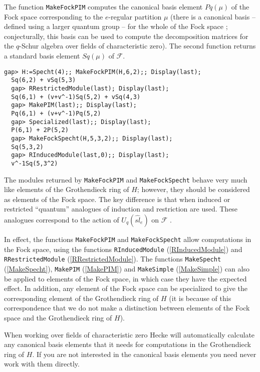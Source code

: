 \documentclass[a4paper,11pt]{report}
\begin{document}
{{{ The function \texttt{MakeFockPIM} computes the canonical basis element $Pq(\mu)$ of the Fock space corresponding to the $e$-regular partition $\mu$ (there is a canonical basis -- defined using a larger quantum group -- for the
whole of the Fock space \cite{LT}; conjecturally, this basis can be used to compute the decomposition matrices
for the $q$-Schur algebra over fields of characteristic zero). The second function
returns a standard basis element $Sq(\mu)$ of $\mathcal{F}$. 
\begin{Verbatim}[fontsize=\small,frame=single,label=Example]
  gap> H:=Specht(4);; MakeFockPIM(H,6,2);; Display(last);
  Sq(6,2) + vSq(5,3)
  gap> RRestrictedModule(last); Display(last);
  Sq(6,1) + (v+v^-1)Sq(5,2) + vSq(4,3)
  gap> MakePIM(last);; Display(last);
  Pq(6,1) + (v+v^-1)Pq(5,2)
  gap> Specialized(last);; Display(last);
  P(6,1) + 2P(5,2)
  gap> MakeFockSpecht(H,5,3,2);; Display(last);
  Sq(5,3,2)
  gap> RInducedModule(last,0);; Display(last);
  v^-1Sq(5,3^2)
\end{Verbatim}
 The modules returned by \texttt{MakeFockPIM} and \texttt{MakeFockSpecht} behave very much like elements of the Grothendieck ring of $H$; however, they should be considered as elements of the Fock space. The key
difference is that when induced or restricted ``quantum'' analogues of induction and restriction are used. These analogues correspond to
the action of $U_q( \widehat{sl}_{e})$ on $\mathcal{F} $ \cite{LLT}.

 In effect, the functions \texttt{MakeFockPIM} and \texttt{MakeFockSpecht} allow computations in the Fock space, using the functions \texttt{RInducedModule} (\ref{RInducedModule}) and \texttt{RRestrictedModule} (\ref{RRestrictedModule}). The functions \texttt{MakeSpecht} (\ref{MakeSpecht}), \texttt{MakePIM} (\ref{MakePIM}) and \texttt{MakeSimple} (\ref{MakeSimple}) can also be applied to elements of the Fock space, in which case they have the
expected effect. In addition, any element of the Fock space can be specialized
to give the corresponding element of the Grothendieck ring of $H$ (it is because of this correspondence that we do not make a distinction
between elements of the Fock space and the Grothendieck ring of $H$).

 When working over fields of characteristic zero \textsf{Hecke} will automatically calculate any canonical basis elements that it needs for
computations in the Grothendieck ring of $H$. If you are not interested in the canonical basis elements you need never
work with them directly. }

}}
\end{document}

